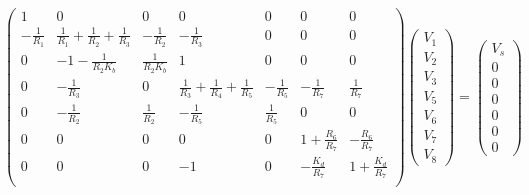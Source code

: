 \begin{equation}
\left(\begin{array}{ccccccc} 
1 & 0 & 0 & 0 & 0 & 0 & 0\\
-\frac{1}{R_1} & \frac{1}{R_1}+\frac{1}{R_2}+\frac{1}{R_3} & -\frac{1}{R_2} & -\frac{1}{R_3}& 0 & 0 & 0 \\
0 & -1-\frac{1}{R_2 K_b} & \frac{1}{R_2 K_b} & 1 & 0 & 0 & 0 \\
0 & -\frac{1}{R_3} & 0 & \frac{1}{R_3} +\frac{1}{R_4}+\frac{1}{R_5} & -\frac{1}{R_5} & -\frac{1}{R_7} & \frac{1}{R_7} \\
0 & -\frac{1}{R_2} & \frac{1}{R_2} & -\frac{1}{R_5} & \frac{1}{R_5} & 0 & 0 \\
0 & 0 & 0 & 0 & 0 & 1+\frac{R_6}{R_7} & -\frac{R_6}{R_7} \\
0 & 0 & 0 & -1 & 0 & -\frac{K_d}{R_7} & 1 + \frac{K_d}{R_7} \\
\end{array}\right)
\left(\begin{array}{c} V_1 \\ V_2 \\ V_3 \\ V_5 \\ V_6 \\ V_7 \\ V_8 \end{array}\right) 
= \left(\begin{array}{c} V_s\\ 0 \\ 0 \\ 0 \\0 \\ 0 \\0 \end{array}\right)
\end{equation}
